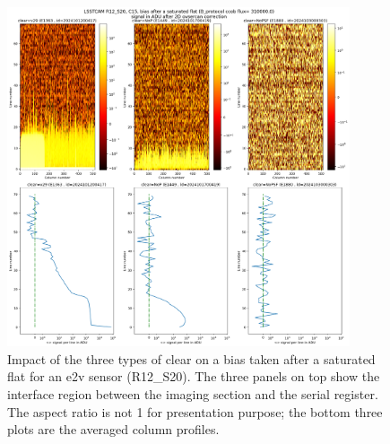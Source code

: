 \begin{figure}[ht]
\begin{centering}
\includegraphics[width=0.9\textwidth]{figures/plots_R12_S20_C15_E1880_bias_2024103000303.png}
\end{centering}
\caption{Impact of the three types of clear on a bias
taken after a saturated flat for an e2v sensor (R12\_S20).
The three panels on top show the interface region between the imaging section and the serial register. The aspect ratio is not 1 for presentation purpose; the bottom three plots are the averaged column profiles.}
\label{fig:clear_e2v}
\end{figure}


